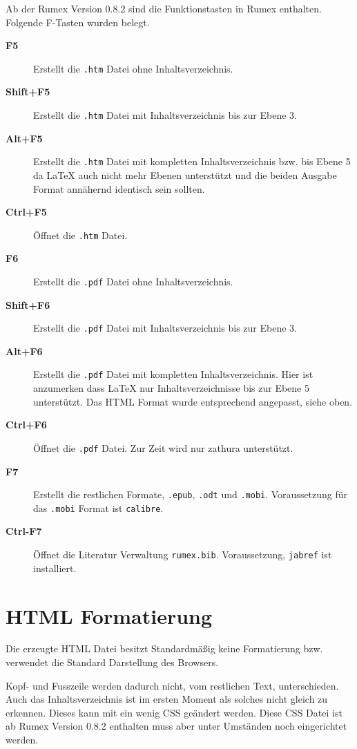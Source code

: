 Ab der Rumex Version 0.8.2 sind die Funktionstasten in Rumex enthalten.
Folgende F-Tasten wurden belegt.

\begin{description}
\item[\textbf{F5}]
Erstellt die \texttt{.htm} Datei ohne Inhaltsverzeichnis.
\item[\textbf{Shift+F5}]
Erstellt die \texttt{.htm} Datei mit Inhaltsverzeichnis bis zur Ebene 3.
\item[\textbf{Alt+F5}]
Erstellt die \texttt{.htm} Datei mit kompletten Inhaltsverzeichnis bzw.
bis Ebene 5 da LaTeX auch nicht mehr Ebenen unterstützt und die beiden
Ausgabe Format annähernd identisch sein sollten.
\item[\textbf{Ctrl+F5}]
Öffnet die \texttt{.htm} Datei.
\item[\textbf{F6}]
Erstellt die \texttt{.pdf} Datei ohne Inhaltsverzeichnis.
\item[\textbf{Shift+F6}]
Erstellt die \texttt{.pdf} Datei mit Inhaltsverzeichnis bis zur Ebene 3.
\item[\textbf{Alt+F6}]
Erstellt die \texttt{.pdf} Datei mit kompletten Inhaltsverzeichnis. Hier
ist anzumerken dass LaTeX nur Inhaltsverzeichnisse bis zur Ebene 5
unterstützt. Das HTML Format wurde entsprechend angepasst, siehe oben.
\item[\textbf{Ctrl+F6}]
Öffnet die \texttt{.pdf} Datei. Zur Zeit wird nur zathura unterstützt.
\item[\textbf{F7}]
Erstellt die restlichen Formate, \texttt{.epub}, \texttt{.odt} und
\texttt{.mobi}. Voraussetzung für das \texttt{.mobi} Format ist
\texttt{calibre}.
\item[\textbf{Ctrl-F7}]
Öffnet die Literatur Verwaltung \texttt{rumex.bib}. Voraussetzung,
\texttt{jabref} ist installiert.
\end{description}

\section{HTML Formatierung}\label{html-formatierung}

Die erzeugte HTML Datei besitzt Standardmäßig keine Formatierung bzw.
verwendet die Standard Darstellung des Browsers.

Kopf- und Fusszeile werden dadurch nicht, vom restlichen Text,
unterschieden. Auch das Inhaltsverzeichnis ist im ersten Moment als
solches nicht gleich zu erkennen. Dieses kann mit ein wenig CSS geändert
werden. Diese CSS Datei ist ab Rumex Version 0.8.2 enthalten muss aber
unter Umständen noch eingerichtet werden.

